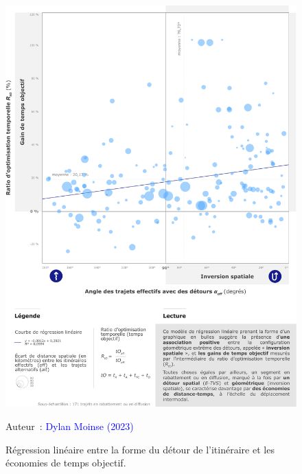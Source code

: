 \begin{refsegment}
    \begin{figure}[h!]\vspace*{4pt}
        \caption{Régression linéaire entre la forme du détour de l'itinéraire et les économies de temps objectif.}
        \label{fig-chap5:regression-detour-gain-temps}
        \centerline{\includegraphics[width=1\columnwidth]{src/Figures/Chap-5/FR_Detours_Ratios_angles.pdf}}
        \vspace{5pt}
        \begin{flushright}\scriptsize{
        Auteur~: \textcolor{blue}{Dylan Moinse (2023)}
        }\end{flushright}
    \end{figure}


\end{refsegment}
